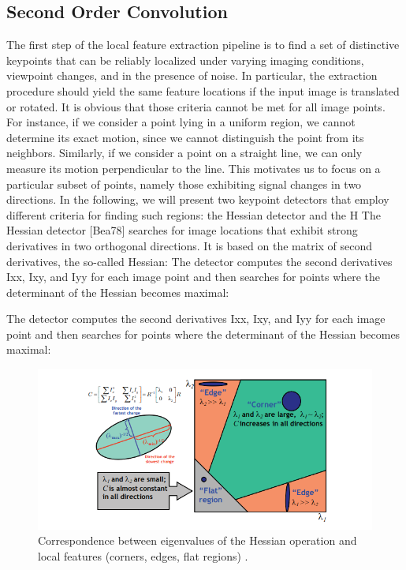 \subsection{Second Order Convolution}
The first step of the local feature extraction pipeline is to find a set of distinctive
keypoints that can be reliably localized under varying imaging conditions, viewpoint
changes, and in the presence of noise. In particular, the extraction procedure should
yield the same feature locations if the input image is translated or rotated. It is
obvious that those criteria cannot be met for all image points. For instance, if we
consider a point lying in a uniform region, we cannot determine its exact motion,
since we cannot distinguish the point from its neighbors. Similarly, if we consider a
point on a straight line, we can only measure its motion perpendicular to the line.
This motivates us to focus on a particular subset of points, namely those exhibiting
signal changes in two directions. In the following, we will present two keypoint
detectors that employ different criteria for finding such regions: the Hessian detector
and the H
The Hessian detector [Bea78] searches for image locations that exhibit strong derivatives
in two orthogonal directions. It is based on the matrix of second derivatives,
the so-called Hessian:
The detector computes the second derivatives Ixx, Ixy, and Iyy for each image point
and then searches for points where the determinant of the Hessian becomes maximal:

The detector computes the second derivatives Ixx, Ixy, and Iyy for each image point
and then searches for points where the determinant of the Hessian becomes maximal:

\begin{figure}[!tbh] 
	\centering
	\includegraphics[width=1\textwidth]{hessian_app.png} 
	\caption{Correspondence between eigenvalues of the Hessian operation and local features (corners, edges, flat regions) \citep{grauman2011visual}.}
	\label{fig:hessian_app}
\end{figure}


